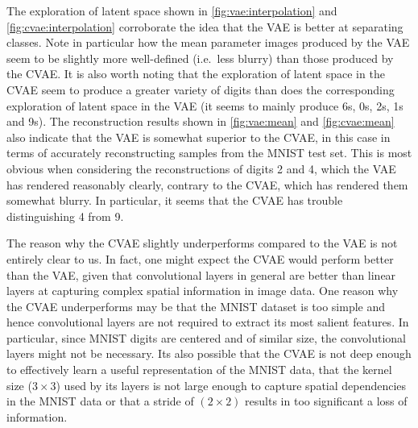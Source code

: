 The exploration of latent space shown in \cref{fig:vae:interpolation} and \cref{fig:cvae:interpolation} corroborate the idea that the VAE is better at separating classes. Note in particular how the mean parameter images produced by the VAE seem to be slightly more well-defined (i.e.\ less blurry) than those produced by the CVAE\@. It is also worth noting that the exploration of latent space in the CVAE seem to produce a greater variety of digits than does the corresponding exploration of latent space in the VAE (it seems to mainly produce 6s, 0s, 2s, 1s and 9s). The reconstruction results shown in \cref{fig:vae:mean} and \cref{fig:cvae:mean} also indicate that the VAE is somewhat superior to the CVAE, in this case in terms of accurately reconstructing samples from the MNIST test set. This is most obvious when considering the reconstructions of digits 2 and 4, which the VAE has rendered reasonably clearly, contrary to the CVAE, which has rendered them somewhat blurry. In particular, it seems that the CVAE has trouble distinguishing 4 from 9. 

The reason why the CVAE slightly underperforms compared to the VAE is not entirely clear to us. In fact, one might expect the CVAE would perform better than the VAE, given that convolutional layers in general are better than linear layers at capturing complex spatial information in image data. One reason why the CVAE underperforms may be that the MNIST dataset is too simple and hence convolutional layers are not required to extract its most salient features. In particular, since MNIST digits are centered and of similar size, the convolutional layers might not be necessary. Its also possible that the CVAE is not deep enough to effectively learn a useful representation of the MNIST data, that the kernel size ($3\times3$) used by its layers is not large enough to capture spatial dependencies in the MNIST data or that a stride of $(2\times2)$ results in too significant a loss of information. 

